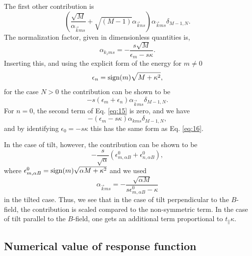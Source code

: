 The first other contribution is
\begin{equation}
  \label{eq:15}
  \left(\frac{\sqrt{M}}{\alpha_{\vec{k} m s}} + \sqrt{(M-1)} \alpha_{\vec{k} n s}\right) \alpha_{\vec{k} m s} \delta_{M-1, N}.
\end{equation}
The normalization factor, given in dimensionless quantities is,
\[
\alpha_{k_z m s} = - \frac{s \sqrt{M}}{\epsilon_{m} - s \kappa}.
\]
Inserting this, and using the explicit form of the energy for \( m \neq 0 \)
\[
\epsilon_n = \operatorname{sign}(m) \sqrt{M + \kappa^2},
\]
for the case \( N > 0 \) the contribution can be shown to be
\begin{equation}
  \label{eq:16}
  -s (\epsilon_m + \epsilon_n)\alpha_{\vec{k} m s} \delta_{M-1, N}.
\end{equation}
For \( n = 0 \), the second term of Eq. \eqref{eq:15} is zero, and we have
\begin{equation}
  \label{eq:17}
  -(\epsilon_m - s \kappa) \alpha_{k m s} \delta_{M-1, N},
\end{equation}
and by identifying \( \epsilon_0 = - s \kappa \) this has the same form as Eq. \eqref{eq:16}.

In the case of tilt, however, the contribution can be shown to be
\begin{equation}
  \label{eq:22}
  -\frac{s}{\sqrt{\alpha}} (\epsilon_{m, \alpha B}^0 + \epsilon_{n, \alpha B}^0),
\end{equation}
where \( \epsilon_{m, \alpha B}^0 = \operatorname{sign}(m) \sqrt{\alpha M + \kappa^2}  \) and we used
\[
\alpha_{\vec{k} m s} = - \frac{\sqrt{\alpha M}}{s \epsilon^{0}_{m, \alpha B} - \kappa}
\]
in the tilted case.
Thus, we see that in the case of tilt perpendicular to the \( B \)-field, the contribution is scaled compared to the non-symmetric term.
In the case of tilt parallel to the \( B \)-field, one gets an additional term proportional to \( t_{\parallel} \kappa \).


\subsection{Numerical value of response function}

